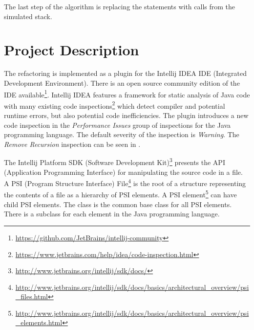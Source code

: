 The last step of the algorithm is replacing the  statements with  calls from the simulated stack.

\section{Project Description}

The refactoring is implemented as a plugin for the Intellij IDEA IDE (Integrated Development Environment).
 There is an open source community edition of the IDE
available\footnote{\url{https://github.com/JetBrains/intellij-community}}. Intellij IDEA features a framework for
static analysis of Java code with many existing code
inspections\footnote{\url{https://www.jetbrains.com/help/idea/code-inspection.html}} which detect compiler and potential
runtime errors, but also potential code inefficiencies. The plugin introduces a new code inspection in the
\textit{Performance Issues} group of inspections for the Java programming language. The default severity of the inspection is
\textit{Warning}. The \textit{Remove Recursion} inspection can be seen in .

The Intellij Platform SDK (Software Development Kit)\footnote{\url{http://www.jetbrains.org/intellij/sdk/docs/}}
presents the API (Application Programming Interface) for manipulating
the source code in a file. A PSI (Program Structure Interface)
File\footnote{\url{http://www.jetbrains.org/intellij/sdk/docs/basics/architectural_overview/psi_files.html}} is the root
of a structure representing the contents of a file as a hierarchy of PSI elements. A PSI
element\footnote{\url{http://www.jetbrains.org/intellij/sdk/docs/basics/architectural_overview/psi_elements.html}} can
have child PSI elements. The  class is the common base class for all PSI elements. There is a
 subclass for each element in the Java programming language.

